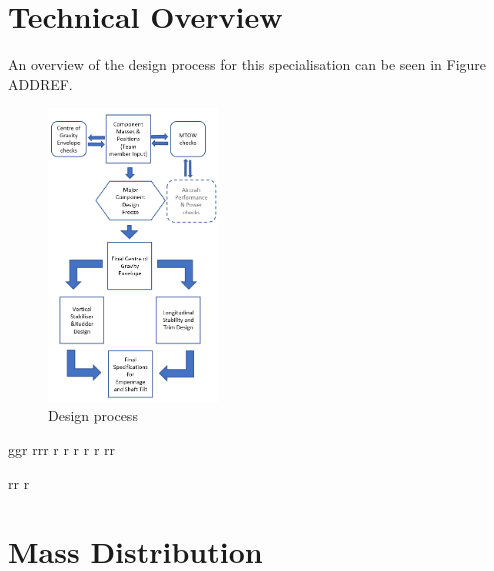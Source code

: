 \documentclass[11pt,a4paper]{article}
\begin{document}
\section{Technical Overview}
An overview of the design process for this specialisation can be seen in  Figure ADDREF.
\begin{figure}[H]
	\flushright
	\includegraphics[width=0.4\textwidth]{Flowchart.PNG}
	\caption{Design process}
	\centering
	\label{fig:flowchart}
\end{figure}
ggr
rrr
r
r
r
r
r
rr

rr
r

\section{Mass Distribution}
\end{document}
